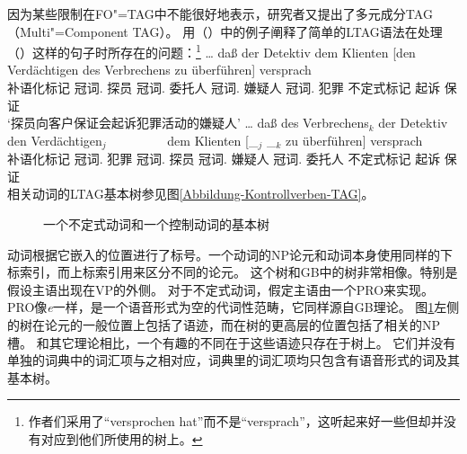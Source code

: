 因为某些限制在FO"=TAG中不能很好地表示\citep[--50]{Rambow94a}，研究者又提出了多元成分TAG（Multi"=Component TAG）。 
\citet*{JBR2000a}用（）中的例子阐释了简单的LTAG语法在处理（）这样的句子时所存在的问题：\footnote{
  作者们采用了``{versprochen hat}''而不是``{versprach}''，这听起来好一些但却并没有对应到他们所使用的树上。
}
\eal
\ex 
\gll \ldots{} daß  der        Detektiv  dem        Klienten [den Verdächtigen des Verbrechens zu überführen] versprach\\
{}  补语化标记  冠词.\nom{} 探员 冠词.\dat{} 委托人   \spacebr{}冠词.\acc{} 嫌疑人 冠词.\gen{} 犯罪 不定式标记 起诉 保证\\
  \glt `探员向客户保证会起诉犯罪活动的嫌疑人'
\ex\label{Beispiel-Joshi-NP4} 
\gll \ldots{} daß  des        Verbrechens$_k$ der        Detektiv  den Verdächtigen$_j$~~~~~~~~~ dem         Klienten [\_$_j$ \_$_k$ zu überführen] versprach\\
{}     补语化标记  冠词.\gen{} 犯罪           冠词.\nom{} 探员 冠词.\acc{} 嫌疑人   冠词.\dat{}  委托人   {}      {}     不定式标记 起诉  保证\\
\zl
相关动词的LTAG基本树参见图\vref{Abbildung-Kontrollverben-TAG}。
\begin{figure}
\caption{\label{Abbildung-Kontrollverben-TAG}一个不定式动词和一个控制动词的基本树} 
\end{figure}%
动词根据它嵌入的位置进行了标号。一个动词的NP论元和动词本身使用同样的下标索引，而上标索引用来区分不同的论元。
这个树和GB\indexgb 中的树非常相像。特别是假设主语出现在VP的外侧。
对于不定式动词，假定主语由一个PRO来实现。PRO像\emph{e}一样，是一个语音形式为空的代词性范畴，它同样源自GB理论。
图\ref{Abbildung-Kontrollverben-TAG}左侧的树在论元的一般位置上包括了语迹，而在树的更高层的位置包括了相关的NP槽。
和其它理论相比，一个有趣的不同在于这些语迹只存在于树上。
它们并没有单独的词典中的词汇项与之相对应，词典里的词汇项均只包含有语音形式的词及其基本树。

